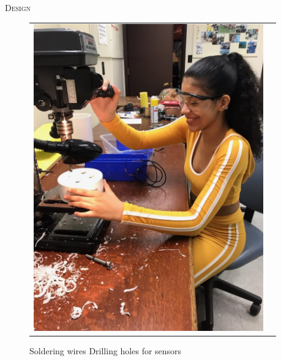 \documentclass[final,t]{beamer}
\begin{document}
\begin{frame}{}
\begin{columns}[t]
\begin{column}{.5\linewidth}
\begin{block}{\textsc{Design}}
\begin{center}
\begin{figure}
\begin{tabular}{cc}
                    \includegraphics[scale = 0.47]{assets/IMG_2627.jpg}
                    \end{tabular}
                    \caption{Soldering wires \hspace{24mm} Drilling holes for sensors}
                    \end{figure}
                    \end{center}

                    \vspace*{6mm}
                \end{block}
            \end{column}

            \begin{column}{.5\linewidth}


\end{column}
\end{columns}
\end{frame}
\end{document}
